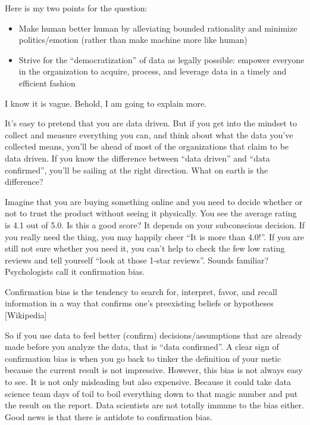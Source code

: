 \documentclass[12pt,]{krantz}
\providecommand{\tightlist}{%
  \setlength{\itemsep}{0pt}\setlength{\parskip}{0pt}}
\renewenvironment{quote}{\begin{VF}}{\end{VF}}
\theoremstyle{definition}
\theoremstyle{definition}
\theoremstyle{definition}
\theoremstyle{remark}
\begin{document}
Here is my two points for the question:

\begin{itemize}
\tightlist
\item
  Make human better human by alleviating bounded rationality and
  minimize politics/emotion (rather than make machine more like human)
\item
  Strive for the ``democratization'' of data as legally possible:
  empower everyone in the organization to acquire, process, and leverage
  data in a timely and efficient fashion
\end{itemize}

I know it is vague. Behold, I am going to explain more.

It's easy to pretend that you are data driven. But if you get into the
mindset to collect and measure everything you can, and think about what
the data you've collected means, you'll be ahead of most of the
organizations that claim to be data driven. If you know the difference
between ``data driven'' and ``data confirmed'', you'll be sailing at the
right direction. What on earth is the difference?

Imagine that you are buying something online and you need to decide
whether or not to trust the product without seeing it physically. You
see the average rating is 4.1 out of 5.0. Is this a good score? It
depends on your subconscious decision. If you really need the thing, you
may happily cheer ``It is more than 4.0!''. If you are still not sure
whether you need it, you can't help to check the few low rating reviews
and tell yourself ``look at those 1-star reviews''. Sounds familiar?
Psychologists call it confirmation bias.

\begin{quote}
Confirmation bias is the tendency to search for, interpret, favor, and
recall information in a way that confirms one's preexisting beliefs or
hypotheses {[}Wikipedia{]}
\end{quote}

So if you use data to feel better (confirm) decisions/assumptions that
are already made before you analyze the data, that is ``data
confirmed''. A clear sign of confirmation bias is when you go back to
tinker the definition of your metic because the current result is not
impressive. However, this bias is not always easy to see. It is not only
misleading but also expensive. Because it could take data science team
days of toil to boil everything down to that magic number and put the
result on the report. Data scientists are not totally immune to the bias
either. Good news is that there is antidote to confirmation bias.
\end{document}
